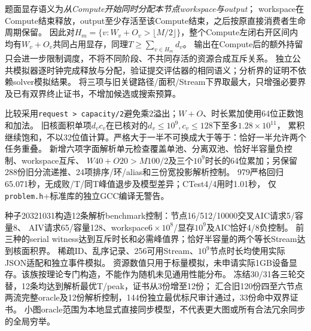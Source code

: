 \documentclass[UTF8,a4paper,11pt,fontset=fandol]{ctexart}
\begin{document}
题面显存语义为\emph{从Compute开始同时分配本节点workspace与output}；
workspace在Compute结束释放，output至少存活至该Compute结束，之后按原直接消费者生命周期保留。
因此对$H_m=\{v:W_v+O_v>\lfloor M/2\rfloor\}$，整个Compute左闭右开区间内
均有$W_v+O_v$共同占用显存，同理$T\ge\sum_{v\in H_m}d_v$。
输出在Compute后的额外持留只会进一步限制调度，不将不同阶段、不共同存活的资源合成互斥关系。
独立公共模拟器逐时钟完成释放与分配，验证提交评估器的相同语义；分析界的证明不依赖solver模拟结果。
将三项与旧关键路径/面积/Stream下界取最大，只增强必要界及已有双界终止证书，不增加候选或搜索预算。

比较采用\texttt{request > capacity/2}避免乘2溢出；$W+O$、时长累加使用64位正数饱和加法。
旧核面积单项$d_vc_v$在已核对的$d_v\le10^9,c_v\le128$下至多$1.28\times10^{11}$，
累积继续饱和，不以32位值计算。严格大于一半不可换成大于等于：恰好一半允许两个任务重叠。
新增六项字面解析单元检查覆盖单池、分离双池、恰好半容量负控制、workspace互斥、
$W40+O20>M100/2$及三个$10^9$时长的64位累加；另保留288份旧分流递推、24项排序/环/alias和三份宽投影解析控制。
979严格回归65.071秒，无成败/T/同T峰值退步及模型差异；CTest4/4用时1.01秒，
仅\texttt{problem.h}+标准库的独立GCC编译无警告。

种子20321031构造12条解析benchmark控制：节点16/512/10000交叉AIC请求5/容量8、
AIV请求65/容量128、workspace$6\times10^8$/显存$10^9$及AIC恰好4/8负控制。
前三种的serial witness达到互斥时长和必需峰值界；恰好半容量的两个等长Stream达到核面积界。
稀疏ID、乱序记录、256可用Stream、$10^9$节点时长均使用实际JSON适配和独立事件模拟。
资源数值只用于标量模拟，未申请实际1GB设备显存。该族按理论专门构造，不能作为随机未见通用性能分布。
冻结30/31各三轮交替，12条均达到解析最优T/peak，证书从3份增至12份；
汇合旧120份四至六节点两流完整oracle及12份解析控制，144份独立最优标尺审计通过，33份命中双界证书。
小图oracle范围为本地显式直接同步模型，不代表更大图或所有合法冗余同步的全局穷举。

\par\smallskip{}\par\smallskip
\end{document}
